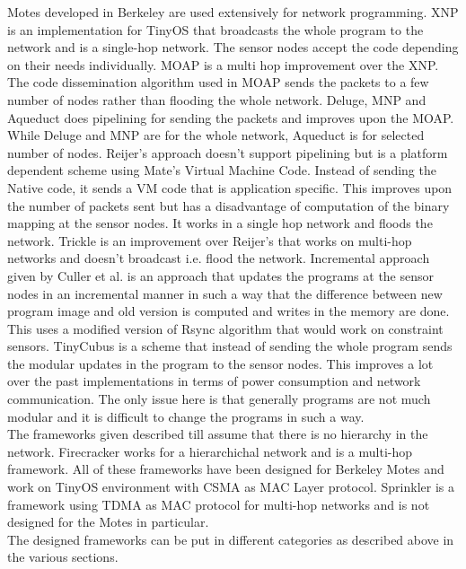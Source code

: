 \documentclass[twocolumn]{article}
\begin{document}
Motes developed in Berkeley are used extensively for network programming. XNP\cite{mote} is an implementation for TinyOS that broadcasts the whole program to the network and is a single-hop network. The sensor nodes accept the code depending on their needs individually. MOAP\cite{Stathopoulos03aremote} is a multi hop improvement over the XNP. The code dissemination algorithm used in MOAP sends the packets to a few number of nodes rather than flooding the whole network. Deluge\cite{Hui04thedynamic}, MNP\cite{Kulkarni05mnp:multihop} and Aqueduct\cite{citeulike:1990821} does pipelining for sending the packets and improves upon the MOAP. While Deluge and MNP are for the whole network, Aqueduct is for selected number of nodes. Reijer's approach\cite{Reijers03efficientcode} doesn't support pipelining but is a platform dependent scheme using Mate's Virtual Machine Code. Instead of sending the Native code, it sends a VM code that is application specific. This improves upon the number of packets sent but has a disadvantage of computation of the binary mapping at the sensor nodes. It works in a single hop network and floods the network. Trickle\cite{Levis04trickle:a} is an improvement over Reijer's that works on multi-hop networks and doesn't broadcast i.e. flood the network. Incremental\cite{Jeong04incrementalnetwork} approach given by Culler et al. is an approach that updates the programs at the sensor nodes in an incremental manner in such a way that the difference between new program image and old version is computed and writes in the memory are done. This uses a modified version of Rsync algorithm that would work on constraint sensors. TinyCubus\cite{Marrón05managementand} is a scheme that instead of sending the whole program sends the modular updates in the program to the sensor nodes. This improves a lot over the past implementations in terms of power consumption and network communication. The only issue here is that generally programs are not much modular and it is difficult to change the programs in such a way.
\\
The frameworks given described till assume that there is no hierarchy in the network. Firecracker\cite{Levis04thefirecracker} works for a hierarchichal network and is a multi-hop framework. All of these frameworks have been designed for Berkeley Motes and work on TinyOS environment with CSMA as MAC Layer protocol. Sprinkler\cite{Naik05sprinkler:a} is a framework using TDMA as MAC protocol for multi-hop networks and is not designed for the Motes in particular.
\\
The designed frameworks can be put in different categories as described above in the various sections.

\newpage



\end{document}
